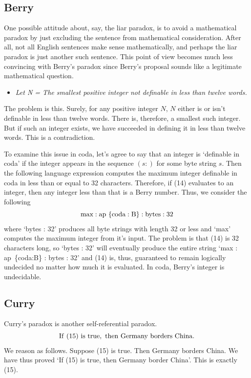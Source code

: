 \documentclass[11pt]{article}
\begin{document}
\subsection{Berry}

     One possible attitude about, say, the liar paradox, is to avoid a mathematical paradox by just excluding
the sentence  from mathematical consideration.  After all, not all English sentences make sense mathematically, and perhaps the liar paradox is just another such sentence.  
This point of view becomes much less convincing with Berry's paradox\cite{Berry} since Berry's proposal 
 sounds like a legitimate mathematical question.
 \begin{itemize}
 \item {\it Let N = The smallest positive integer not definable in less than twelve words.}
 \end{itemize}
The problem is this.  Surely, for any positive integer $N$, $N$ either is or isn't definable in less than twelve words.
There is, therefore, a smallest such integer.  But if such an integer exists, we have succeeded in defining it in
less than twelve words.  This is a contradiction.

    To examine this issue in coda, let's agree to say that an integer is `definable in coda' if the
integer appears in the sequence $(s:)$ for some byte string $s$.  Then the following language expression
computes the maximum integer definable in coda in less than or equal to 32 characters.  Therefore,
if (14) evaluates to an integer, then any integer less than that is a Berry number.
Thus, we consider the following
\begin{equation}
{\rm max : ap\ \{coda:B\} : bytes : 32}
\end{equation}
where `bytes : 32' produces all byte strings with length 32 or less and `max' computes the maximum integer from it's input.
The problem is that (14) is 32 characters long, so `bytes : 32' will eventually produce the entire string `{\rm max : ap\ \{coda:B\} : bytes : 32}' and 
(14) is, thus, guaranteed to remain logically undecided no matter how much it is evaluated.   
In coda, Berry's integer is undecidable. 

\subsection{Curry}

Curry's paradox\cite{Curry} is another self-referential paradox.
\begin{equation}
{\rm If\ (15)\ is\ true,\ then\ Germany\ borders\ China.}
\end{equation}
We reason as follows.  Suppose (15) is true.  Then Germany borders China.  We have thus
proved `If (15) is true, then Germany border China'.  This is exactly (15).
\end{document}
